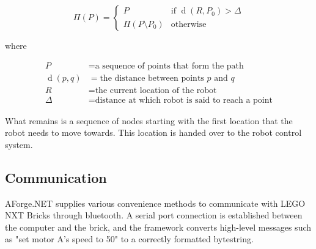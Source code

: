 \documentclass[10pt,twocolumn]{scrartcl}
\DeclareMathOperator{\dist}{d}
\begin{document}
\[
\Pi(P) =
	\begin{cases}
	P & \textrm{if } \dist(R,P_0) > \Delta \\
	\Pi( P \setminus P_0 ) & \textrm{otherwise}
	\end{cases}
\]

where

\begin{align*}
P &= \textrm{a sequence of points that form the path} \\
\dist(p,q) &= \textrm{the distance between points $p$ and $q$} \\
R &= \textrm{the current location of the robot} \\
\Delta &= \textrm{distance at which robot is said to reach a point}
\end{align*}

What remains is a sequence of nodes starting with the first location that the robot needs to move towards. This location is handed over to the robot control system.

\subsection{Communication}
AForge.NET supplies various convenience methods to communicate with LEGO NXT Bricks through bluetooth. A serial port connection is established between the computer and the brick, and the framework converts high-level messages such as "set motor A's speed to 50" to a correctly formatted bytestring.
\end{document}
